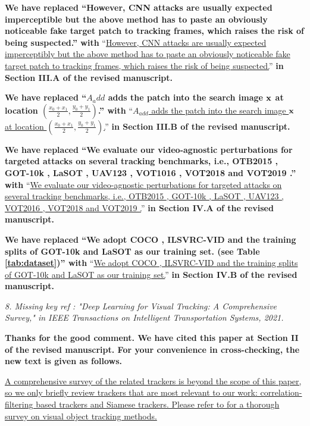 \documentclass[12pt]{article}
\begin{document}
\textbf{We have replaced ``However, CNN attacks are usually expected imperceptible but the above method has to paste an obviously noticeable fake target patch to tracking frames, which raises the risk of being suspected.'' with}
``\uline{However, CNN attacks are usually expected imperceptibly but the above method has to paste an obviously noticeable fake target patch to tracking frames, which raises the risk of being suspected.}''
\textbf{in Section III.A of the revised manuscript.}

\textbf{We have  replaced ``$A_add$ adds the patch into the search image $\textbf x$ at location $(\frac{x_0+x_1}{2},\frac{y_0+y_1}{2})$.'' with}
``\uline{$A_{add}$ adds the patch into the search image $\textbf x$ at location $(\frac{x_0+x_1}{2},\frac{y_0+y_1}{2})$.}''
\textbf{in Section III.B of the revised manuscript.}

\textbf{We have replaced ``We evaluate our video-agnostic perturbations for targeted attacks on several tracking benchmarks, i.e., OTB2015 \cite{OTB}, GOT-10k \cite{GOT-10k}, LaSOT \cite{LaSOT}, UAV123 \cite{UAV123}, VOT1016 \cite{VOT2016}, VOT2018 \cite{VOT2018} and VOT2019 \cite{VOT2019}.'' with}
``\uline{We evaluate our video-agnostic perturbations for targeted attacks on several tracking benchmarks, i.e., OTB2015 \cite{OTB}, GOT-10k \cite{GOT-10k}, LaSOT \cite{LaSOT}, UAV123 \cite{UAV123}, VOT2016 \cite{VOT2016}, VOT2018 \cite{VOT2018} and VOT2019 \cite{VOT2019}.}''
\textbf{in Section IV.A of the revised manuscript.}

\textbf{We have replaced ``We adopt COCO \cite{COCO}, ILSVRC-VID \cite{VID} and the training splits of GOT-10k \cite{GOT-10k} and LaSOT \cite{LaSOT} as our training set. (see Table \ref{tab:dataset})'' with}
``\uline{We adopt COCO \cite{COCO}, ILSVRC-VID \cite{VID} and the training splits of GOT-10k \cite{GOT-10k} and LaSOT \cite{LaSOT} as our training set.}''
\textbf{in Section IV.B of the revised manuscript.}

\textit{8. Missing key ref : "Deep Learning for Visual Tracking: A Comprehensive Survey," in IEEE Transactions on Intelligent Transportation Systems, 2021.}

\textbf{Thanks for the good comment. We have cited this paper at Section II of the revised manuscript.  For your convenience in cross-checking, the new text is given as follows.}

\uline{A comprehensive survey of the related trackers is beyond the scope of this paper, so we only briefly review trackers that are most relevant to our work: correlation-filtering based trackers and Siamese trackers. Please refer to \cite{9339950} for a thorough survey on visual object tracking methods.}
\end{document}
